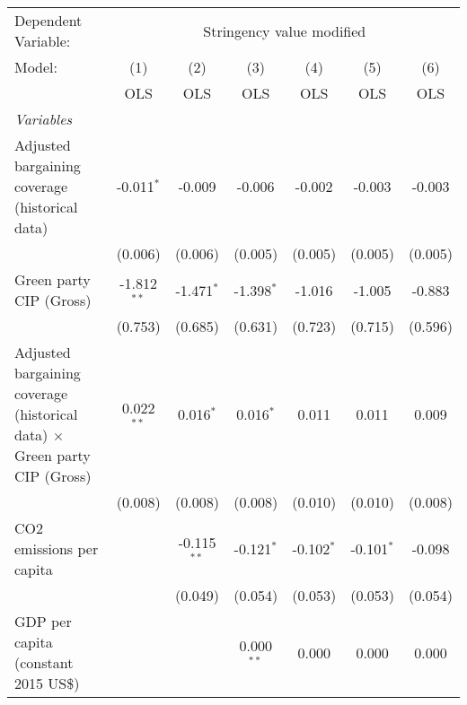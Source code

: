 
\begingroup
\centering
\begin{tabular}{lcccccc}
   \toprule
   Dependent Variable: & \multicolumn{6}{c}{Stringency value modified}\\
   Model:                                                                           & (1)           & (2)           & (3)          & (4)          & (5)          & (6)\\  
                                                                                    &  OLS          & OLS           & OLS          & OLS          & OLS          & OLS\\  
   \midrule
   \emph{Variables}\\
   Adjusted bargaining coverage (historical data)                                   & -0.011$^{*}$  & -0.009        & -0.006       & -0.002       & -0.003       & -0.003\\   
                                                                                    & (0.006)       & (0.006)       & (0.005)      & (0.005)      & (0.005)      & (0.005)\\   
   Green party CIP (Gross)                                                          & -1.812$^{**}$ & -1.471$^{*}$  & -1.398$^{*}$ & -1.016       & -1.005       & -0.883\\   
                                                                                    & (0.753)       & (0.685)       & (0.631)      & (0.723)      & (0.715)      & (0.596)\\   
   Adjusted bargaining coverage (historical data) $\times$ Green party CIP (Gross)  & 0.022$^{**}$  & 0.016$^{*}$   & 0.016$^{*}$  & 0.011        & 0.011        & 0.009\\   
                                                                                    & (0.008)       & (0.008)       & (0.008)      & (0.010)      & (0.010)      & (0.008)\\   
   CO2 emissions per capita                                                         &               & -0.115$^{**}$ & -0.121$^{*}$ & -0.102$^{*}$ & -0.101$^{*}$ & -0.098\\   
                                                                                    &               & (0.049)       & (0.054)      & (0.053)      & (0.053)      & (0.054)\\   
   GDP per capita (constant 2015 US\$)                                              &               &               & 0.000$^{**}$ & 0.000        & 0.000        & 0.000\\   

\end{tabular}
